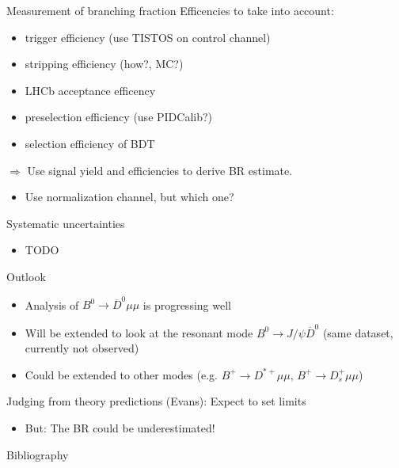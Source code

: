 \documentclass[compress,aspectratio=43]{beamer}
\begin{document}
\begin{frame}{Measurement of branching fraction}
  Efficencies to take into account:
  \begin{itemize}
    \item trigger efficiency (use TISTOS on control channel)
    \item stripping efficiency (how?, MC?)
    \item LHCb acceptance efficency
    \item preselection efficiency (use PIDCalib?)
    \item selection efficiency of BDT
  \end{itemize}
  $\Rightarrow$ Use signal yield and efficiencies to derive BR estimate.
  \begin{itemize}
    \item Use normalization channel, but which one?
  \end{itemize}
\end{frame}

\begin{frame}{Systematic uncertainties}
  \begin{itemize}
    \item TODO
  \end{itemize}
\end{frame}

\begin{frame}{Outlook}
  \begin{itemize}
    \item Analysis of $B^0\to \overline{D}^0 \mu\mu$ is progressing well
    \item Will be extended to look at the resonant mode $B^0\to J/\psi\overline{D}^0$ (same dataset, currently not observed)
    \item Could be extended to other modes (e.g. $B^+\to D^{*+}\mu\mu$, $B^+\to D_s^+\mu\mu$)
  \end{itemize}
  Judging from theory predictions (Evans): Expect to set limits
  \begin{itemize}
    \item But: The BR could be underestimated!
  \end{itemize}
\end{frame}

\begin{frame}{Bibliography}
  \small
  \printbibliography
\end{frame}
\end{document}
